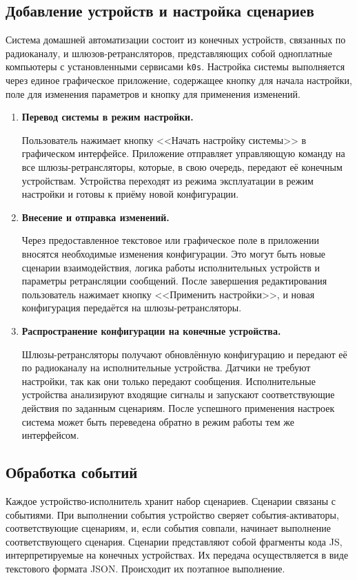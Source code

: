 \documentclass[a4paper,12pt]{article}
\begin{document}
\subsection{Добавление устройств и настройка сценариев}

Система домашней автоматизации состоит из конечных устройств, связанных по радиоканалу, и шлюзов-ретрансляторов, представляющих собой одноплатные компьютеры с установленными сервисами \texttt{k0s}. Настройка системы выполняется через единое графическое приложение, содержащее кнопку для начала настройки, поле для изменения параметров и кнопку для применения изменений.

\begin{enumerate}[label=\textbf{\arabic*.}]
    \item \textbf{Перевод системы в режим настройки.} 
    
    Пользователь нажимает кнопку <<Начать настройку системы>> в графическом интерфейсе. Приложение отправляет управляющую команду на все шлюзы-ретрансляторы, которые, в свою очередь, передают её конечным устройствам. Устройства переходят из режима эксплуатации в режим настройки и готовы к приёму новой конфигурации.
    
    \item \textbf{Внесение и отправка изменений.} 
    
    Через предоставленное текстовое или графическое поле в приложении вносятся необходимые изменения конфигурации. Это могут быть новые сценарии взаимодействия, логика работы исполнительных устройств и параметры ретрансляции сообщений. После завершения редактирования пользователь нажимает кнопку <<Применить настройки>>, и новая конфигурация передаётся на шлюзы-ретрансляторы.
    
    \item \textbf{Распространение конфигурации на конечные устройства.} 
    
    Шлюзы-ретрансляторы получают обновлённую конфигурацию и передают её по радиоканалу на исполнительные устройства. Датчики не требуют настройки, так как они только передают сообщения. Исполнительные устройства анализируют входящие сигналы и запускают соответствующие действия по заданным сценариям. После успешного применения настроек система может быть переведена обратно в режим работы тем же интерфейсом.
\end{enumerate}





\subsection{Обработка событий}
Каждое устройство-исполнитель хранит набор сценариев. Сценарии связаны с событиями. При выполнении события устройство сверяет события-активаторы, соответствующие сценариям, и, если события совпали, начинает выполнение соответствующего сценария. Сценарии представляют собой фрагменты кода JS, интерпретируемые на конечных устройствах. Их передача осуществляется в виде текстового формата JSON. Происходит их поэтапное выполнение.
\end{document}
